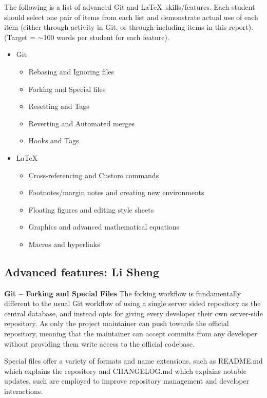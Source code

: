 \documentclass[a4paper, 11pt]{report}
\begin{document}
The following is a list of advanced Git and \LaTeX\ skills/features. Each student should select one pair of items from each list and demonstrate actual use of each item (either through activity in Git, or through including items in this report). (Target = $\sim$100 words per student for each feature).
\begin{itemize}
    \item Git
    \begin{itemize}
        \item Rebasing and Ignoring files
        \item Forking and Special files
        \item Resetting and Tags
        \item Reverting and Automated merges
        \item Hooks and Tags
    \end{itemize}
    \item \LaTeX\ 
    \begin{itemize}
        \item Cross-referencing and Custom commands
        \item Footnotes/margin notes and creating new environments
        \item Floating figures and editing style sheets
        \item Graphics and advanced mathematical equations
        \item Macros and hyperlinks
    \end{itemize}
\end{itemize}

\subsection{Advanced features: Li Sheng}

\textbf{Git – Forking and Special Files}
The forking workflow is fundamentally different to the usual Git workflow of using a single server sided repository as the central database, and instead opts for giving every developer their own server-side repository. As only the project maintainer can push towards the official repository, meaning that the maintainer can accept commits from any developer without providing them write access to the official codebase. \cite{ali6}

Special files offer a variety of formats and name extensions, such as README.md which explains the repository and CHANGELOG.md which explains notable updates, such are employed to improve repository management and developer interactions. \cite{ali7}
\end{document}
